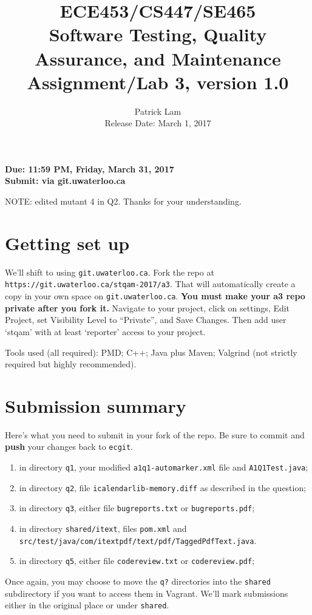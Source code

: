 \documentclass[10pt,hidelinks]{article}
\begin{document}
\title{
ECE453/CS447/SE465 \\
Software Testing, Quality Assurance, and Maintenance\\
Assignment/Lab 3, version 1.0}
\author{Patrick Lam \\
{Release Date: March 1, 2017} \\
}
\renewcommand{\today}{}
\maketitle

\begin{center}

{\bf Due:  11:59 PM, Friday, March 31, 2017} \\
{\bf Submit: via git.uwaterloo.ca }\\
\end{center}

NOTE: edited mutant 4 in Q2. Thanks for your understanding.

\section*{Getting set up}
We'll shift to using {\tt git.uwaterloo.ca}. Fork the repo at 
{\tt https://git.uwaterloo.ca/stqam-2017/a3}. That will automatically create a copy in your own space
on {\tt git.uwaterloo.ca}. {\bf You must make your a3 repo private after you fork it.} Navigate to your project, click on settings, Edit Project, set Visibility Level to ``Private'', and Save Changes. Then add user `stqam' with at least `reporter' access to your project.

Tools used (all required): PMD; C++; Java plus Maven; Valgrind (not
strictly required but highly recommended).

\section*{Submission summary}
Here's what you need to submit in your fork of the repo. Be sure to commit
and {\bf push} your changes back to {\tt ecgit}.
\begin{enumerate}
\item in directory {\tt q1}, your modified {\tt a1q1-automarker.xml} file and {\tt A1Q1Test.java};
\item in directory {\tt q2}, file {\tt icalendarlib-memory.diff} as described in the question;
\item in directory {\tt q3}, either file {\tt bugreports.txt} or {\tt bugreports.pdf};
\item in directory {\tt shared/itext}, files {\tt pom.xml} and {\tt src/test/java/com/itextpdf/text/pdf/TaggedPdfText.java}.
\item in directory {\tt q5}, either file {\tt codereview.txt} or {\tt codereview.pdf};
\end{enumerate}
Once again, you may choose to move the {\tt q?} directories into the {\tt shared} subdirectory if you want to access them in Vagrant. We'll mark submissions either in the original place or under {\tt shared}.
\end{document}
